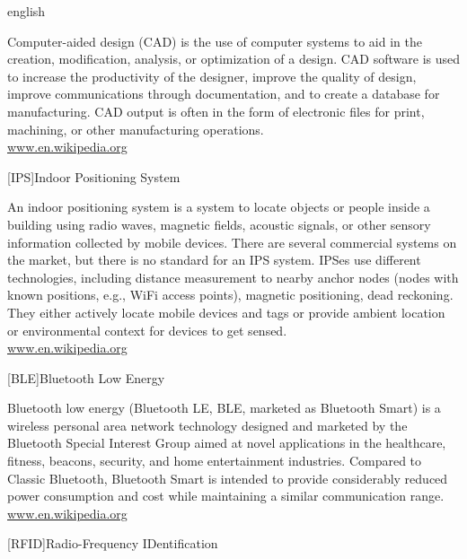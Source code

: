 \begin{acronym}[OpenFOAM]
\begin{otherlanguage*}{english}
{\smaller Computer-aided design (CAD) is the use of computer systems to aid in the creation, modification, analysis, or optimization of a design. CAD software is used to increase the productivity of the designer, improve the quality of design, improve communications through documentation, and to create a database for manufacturing. CAD output is often in the form of electronic files for print, machining, or other manufacturing operations.\\
\href{https://en.wikipedia.org/wiki/Computer-aided_design}{www.en.wikipedia.org}
\par}
%
\end{otherlanguage*}
%
%
[IPS]{Indoor Positioning System}

{\smaller An indoor positioning system is a system to locate objects or people inside a building using radio waves, magnetic fields, acoustic signals, or other sensory information collected by mobile devices. There are several commercial systems on the market, but there is no standard for an IPS system.
IPSes use different technologies, including distance measurement to nearby anchor nodes (nodes with known positions, e.g., WiFi access points), magnetic positioning, dead reckoning. They either actively locate mobile devices and tags or provide ambient location or environmental context for devices to get sensed.\\
\href{https://en.wikipedia.org/wiki/Indoor_positioning_system}{www.en.wikipedia.org}
\par}
%
%
%
[BLE]{Bluetooth Low Energy}

{\smaller Bluetooth low energy (Bluetooth LE, BLE, marketed as Bluetooth Smart) is a wireless personal area network technology designed and marketed by the Bluetooth Special Interest Group aimed at novel applications in the healthcare, fitness, beacons, security, and home entertainment industries. Compared to Classic Bluetooth, Bluetooth Smart is intended to provide considerably reduced power consumption and cost while maintaining a similar communication range.\\
\href{https://en.wikipedia.org/wiki/Bluetooth_low_energy}{www.en.wikipedia.org}
\par}


[RFID]{Radio-Frequency IDentification}


\end{acronym}
